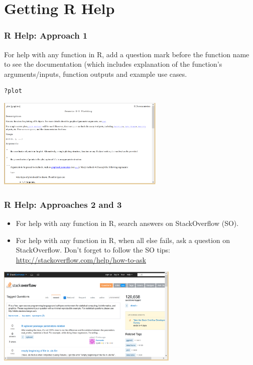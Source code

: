 \section[Help]{Getting R Help}

\begin{frame}[fragile]
\frametitle{R Help: Approach 1}

\vspace{-5pt}
For help with any function in R, add a question mark before the function name to see the documentation (which includes explanation of the function's arguments/inputs, function outputs and example use cases.

  \begin{lstlisting}
?plot
  \end{lstlisting}

  \begin{center}
    \includegraphics[width=0.6\textwidth]{images/Rhelp}
  \end{center}

\end{frame}

\begin{frame}[fragile]
\frametitle{R Help: Approaches 2 and 3}

\vspace{-5pt}
  \begin{itemize}
    \item For help with any function in R, search answers on StackOverflow (SO).
    \item For help with any function in R, when all else fails, ask a question on StackOverflow.  Don't forget to follow the SO tips: \url{http://stackoverflow.com/help/how-to-ask}
  \end{itemize}

  \begin{center}
  \includegraphics[width=0.65\textwidth]{images/SO}
  \end{center}

\end{frame}



